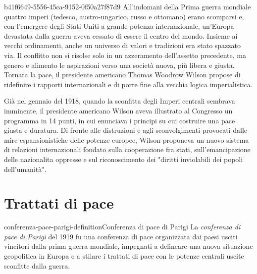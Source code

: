 \documentclass[preview]{standalone}
\begin{document}
\begin{snippet}{b41f6649-5556-45ca-9152-0f50a27f87d9}
    All'indomani della Prima guerra mondiale quattro imperi (tedesco, austro-ungarico, russo e
    ottomano) erano scomparsi e, con l'emergere degli Stati Uniti a grande potenza internazionale,
    un'Europa devastata dalla guerra aveva cessato di essere il centro del mondo. Insieme ai vecchi
    ordinamenti, anche un universo di valori e tradizioni era stato spazzato via. Il conflitto non si
    risolse solo in un azzeramento dell'assetto precedente, ma genero e alimento le aspirazioni
    verso una società nuova, più libera e giusta. Tornata la pace, il presidente americano Thomas
    Woodrow Wilson propose di ridefinire i rapporti internazionali e di porre fine alla vecchia
    logica imperialistica.
    
    Già nel gennaio del 1918, quando la sconfitta degli Imperi centrali sembrava imminente, il
    presidente americano Wilson aveva illustrato al Congresso un programma in 14 punti, in cui
    enunciava i principi su cui costruire una pace giusta e duratura. Di fronte alle distruzioni e agli
    sconvolgimenti provocati dalle mire espansionistiche delle potenze europee, Wilson proponeva
    un nuovo sistema di relazioni internazionali fondato sulla cooperazione fra stati,
    sull'emancipazione delle nazionalita oppresse e sul riconoscimento dei "diritti inviolabili dei
    popoli dell'umanità".
    
\end{snippet}

\section{Trattati di pace}

\begin{snippetdefinition}{conferenza-pace-parigi-definition}{Conferenza di pace di Parigi}
    La \textit{conferenza di pace di Parigi} del 1919 fu una conferenza di
    pace organizzata dai paesi usciti vincitori dalla prima guerra mondiale,
    impegnati a delineare una nuova situazione geopolitica in Europa e a
    stilare i trattati di pace con le potenze centrali uscite sconfitte dalla guerra. 
\end{snippetdefinition}


\end{document}
